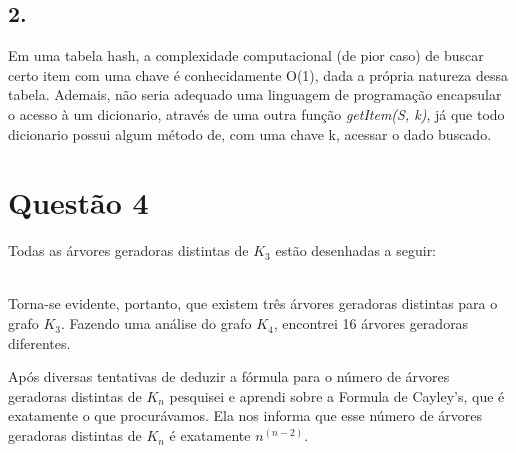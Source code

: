 \documentclass[a4paper,openright, 12pt]{article}
\begin{document}
\subsection*{2.}
Em uma tabela hash, a complexidade computacional (de pior caso) de buscar certo item com uma chave é conhecidamente O(1), dada a própria natureza dessa tabela. Ademais, não seria adequado uma linguagem de programação encapsular o acesso à um dicionario, através de uma outra função \textit{getItem(S, k)}, já que todo dicionario possui algum método de, com uma chave k, acessar o dado buscado.


\section*{Questão 4}
Todas as árvores geradoras distintas de $K_{3}$ estão desenhadas a seguir:
\\ \\ 

Torna-se evidente, portanto, que existem três árvores geradoras distintas para o grafo $K_{3}$. Fazendo uma análise do grafo $K_{4}$, encontrei 16 árvores geradoras diferentes. \par Após diversas tentativas de deduzir a fórmula para o número de árvores geradoras distintas de $K_{n}$ pesquisei e aprendi sobre a Formula de Cayley’s, que é exatamente o que procurávamos. Ela nos informa que esse número de árvores geradoras distintas de $K_{n}$ é exatamente $n^{(n-2)}$.
\end{document}
